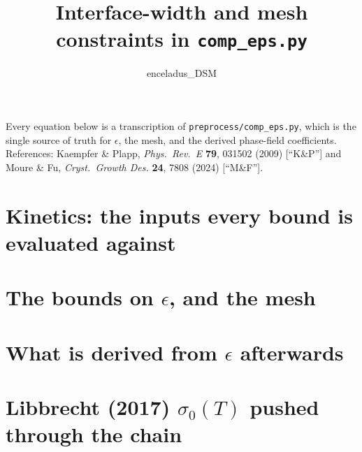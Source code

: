 \documentclass[11pt]{article}
\title{Interface-width and mesh constraints in \texttt{comp\_eps.py}}
\author{enceladus\_DSM}
\date{}
\begin{document}
\maketitle

\noindent
Every equation below is a transcription of
\texttt{preprocess/comp\_eps.py}, which is the single source of truth for
$\epsilon$, the mesh, and the derived phase-field coefficients. References:
Kaempfer \& Plapp, \emph{Phys.\ Rev.\ E} \textbf{79}, 031502 (2009)
[``K\&P''] and Moure \& Fu, \emph{Cryst.\ Growth Des.} \textbf{24}, 7808
(2024) [``M\&F''].

\section{Kinetics: the inputs every bound is evaluated against}


\section{The bounds on $\epsilon$, and the mesh}


\section{What is derived from $\epsilon$ afterwards}


\section{Libbrecht (2017) $\sigma_0(T)$ pushed through the chain}

\end{document}
